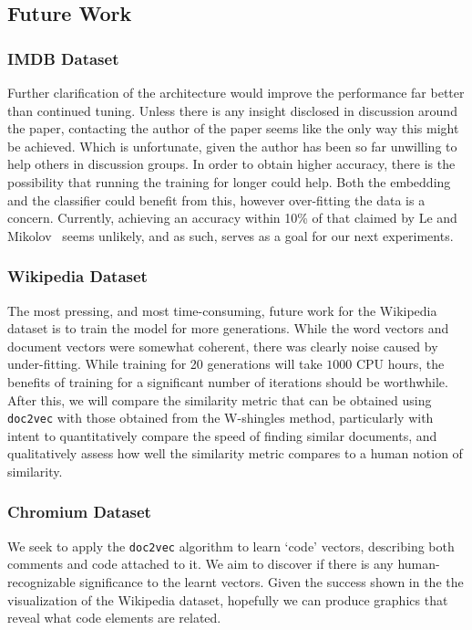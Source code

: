 \documentclass[11pt]{article}
\begin{document}
\subsection*{Future Work}
  \subsubsection*{IMDB Dataset}
    Further clarification of the architecture would improve the performance far better
    than continued tuning. Unless there is any insight disclosed in discussion around
    the paper, contacting the author of the paper seems like the only way this might be
    achieved. Which is unfortunate, given the author has been so far unwilling to
    help others in discussion groups.
    In order to obtain higher accuracy, there is the possibility that running the
    training for longer could help. Both the embedding and the classifier could benefit
    from this, however over-fitting the data is a concern.
    Currently, achieving an accuracy within 10\% of that claimed by Le
    and Mikolov~\cite{le2014distributed} seems unlikely, and as such, serves as
    a goal for our next experiments.

  \subsubsection*{Wikipedia Dataset}
    The most pressing, and most time-consuming, future work for the Wikipedia dataset
    is to train the model for more generations. While the word vectors and document
    vectors were somewhat coherent, there was clearly noise caused by under-fitting.
    While training for 20 generations will take $1000$ CPU hours, the benefits of
    training for a significant number of iterations should be worthwhile.\\
    After this, we will compare the similarity metric that can be obtained using
    \texttt{doc2vec} with those obtained from the W-shingles method, particularly
    with intent to quantitatively compare the speed of finding similar documents, and
    qualitatively assess how well the similarity metric compares to a human notion of
    similarity.

  \subsubsection*{Chromium Dataset}
    We seek to apply the \texttt{doc2vec} algorithm to learn `code' vectors,
    describing both comments and code attached to it. We aim to discover if
    there is any human-recognizable significance to the learnt vectors. Given
    the success shown in the the visualization of the Wikipedia dataset, hopefully
    we can produce graphics that reveal what code elements are related.
\end{document}
